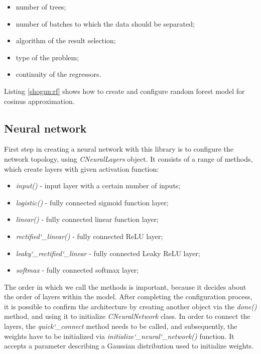 \begin{itemize}
	\item number of trees;
	\item number of batches to which the data should be separated;
	\item algorithm of the result selection;
	\item type of the problem;
	\item continuity of the regressors.
\end{itemize}

Listing \ref{shogun:rf} shows how to create and configure random forest model for cosinus approximation.


\subsection{Neural network}

First step in creating a neural network with this library is to configure the network topology, using \textit{CNeuralLayers} object. It consists of a range of methods, which create layers with given activation function:

\begin{itemize}
	\item \textit{input()} - input layer with a certain number of inputs;
	\item \textit{logistic()} - fully connected sigmoid function layer;
	\item \textit{linear()} - fully connected linear function layer;
	\item \textit{rectified\char`_linear()} - fully connected ReLU layer;
	\item \textit{leaky\char`_rectified\char`_linear} - fully connected Leaky ReLU layer;
	\item \textit{softmax} - fully connected softmax layer;
\end{itemize}

The order in which we call the methods is important, because it decides about the order of layers within the model. After completing the configuration process, it is possible to confirm the architecture by creating another object via the \textit{done()} method, and using it to initialize \textit{CNeuralNetwork} class. In order to connect the layers, the \textit{quick\char`_connect} method needs to be called, and subsequently, the weights have to be initialized via \textit{initialize\char`_neural\char`_network()} function. It accepts a parameter describing a Gaussian distribution used to initialize weights.

